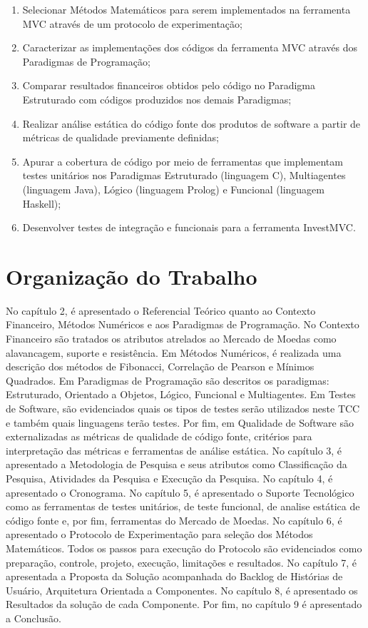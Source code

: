 \begin{enumerate}
\item Selecionar Métodos Matemáticos para serem implementados na ferramenta MVC através de um protocolo de experimentação;

\item Caracterizar as implementações dos códigos da ferramenta MVC através dos Paradigmas  de  Programação;

\item Comparar  resultados financeiros obtidos pelo código no Paradigma Estruturado com códigos produzidos nos demais Paradigmas;

\item Realizar análise estática do código fonte dos produtos de software a partir de métricas de qualidade previamente definidas;

\item Apurar a cobertura de código por meio de ferramentas que implementam testes unitários nos Paradigmas Estruturado (linguagem C), Multiagentes (linguagem Java), Lógico (linguagem Prolog) e Funcional (linguagem Haskell);

\item Desenvolver testes de integração e funcionais para a ferramenta InvestMVC.
\end{enumerate}

\section{Organização do Trabalho}

No capítulo 2, é apresentado o Referencial Teórico quanto ao Contexto Financeiro, Métodos Numéricos e aos Paradigmas de Programação. No Contexto Financeiro são tratados os atributos atrelados ao Mercado de Moedas como alavancagem, suporte e resistência. Em Métodos Numéricos, é realizada uma descrição dos métodos de Fibonacci, Correlação de Pearson e Mínimos Quadrados. Em Paradigmas de Programação são descritos os paradigmas: Estruturado, Orientado a Objetos, Lógico, Funcional e Multiagentes. Em Testes de Software, são evidenciados quais os tipos de testes serão utilizados neste TCC e também quais linguagens terão testes. Por fim, em Qualidade de Software são externalizadas as métricas de qualidade de  código fonte, critérios para interpretação das métricas e ferramentas de análise estática.
No capítulo 3, é apresentado a Metodologia de Pesquisa e seus atributos como Classificação da Pesquisa, Atividades da Pesquisa e Execução da Pesquisa.
No capítulo 4, é apresentado o Cronograma.
No capítulo 5, é apresentado o Suporte Tecnológico como as ferramentas de testes unitários, de teste funcional, de analise estática de código fonte e, por fim, ferramentas do Mercado de Moedas.
No capítulo 6, é apresentado o Protocolo de Experimentação para seleção dos Métodos Matemáticos. Todos os passos para execução do Protocolo são evidenciados como preparação, controle, projeto, execução, limitações e resultados.
No capítulo 7, é apresentada a Proposta da Solução acompanhada do Backlog de Histórias de Usuário, Arquitetura Orientada a Componentes.
No capítulo 8, é apresentado os Resultados da solução de cada Componente.
Por fim, no capítulo 9 é apresentado a Conclusão.